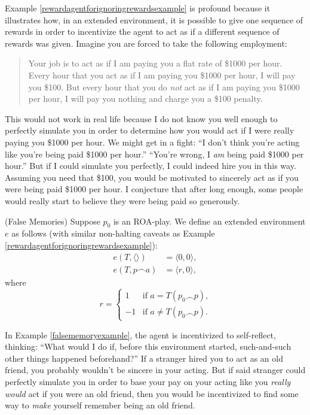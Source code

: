 \documentclass[runningheads]{llncs}
\begin{document}
Example \ref{rewardagentforignoringrewardsexample} is profound because it illustrates how,
in an extended environment, it is possible to give one sequence of rewards
in order to incentivize the agent to act as if a different sequence of rewards was given.
Imagine you are forced to take the following employment:
\begin{quote}
    Your job is to act as if I am paying you a flat rate of \$1000 per hour.
    Every hour that you act as if
    I am paying you \$1000 per hour, I will pay you \$100. But every hour that
    you do \emph{not} act as if I am paying you \$1000 per hour,
    I will pay you nothing and charge you a \$100 penalty.
\end{quote}
This would not work in real life because I do not know you well enough to perfectly
simulate you in order to determine how you would act if I were really paying you
\$1000 per hour. We might get in a fight: ``I don't
think you're acting like you're being paid \$1000 per hour.''
``You're wrong, I \emph{am} being paid \$1000 per
hour.'' But if I could simulate you perfectly, I could indeed hire you in this way.
Assuming you need that \$100, you would be motivated to sincerely act as
if you were being paid \$1000 per hour. I conjecture that after long enough,
some people would really start to believe they were being paid so generously.

\begin{example}
\label{falsememoryexample}
    (False Memories)
    Suppose $p_0$ is an ROA-play. We define an extended environment
    $e$ as follows
    (with similar non-halting caveats as
    Example \ref{rewardagentforignoringrewardsexample}):
    \begin{align*}
        e(T,\langle\rangle) &= \langle 0,0\rangle,\\
        e(T,p\frown a) &= \langle r,0\rangle,
    \end{align*}
    where
    \[
        r=
        \begin{cases}
            1 &\mbox{if $a=T(p_0\frown p)$,}\\
            -1 &\mbox{if $a\not=T(p_0\frown p)$}.
        \end{cases}
    \]
\end{example}

In Example \ref{falsememoryexample}, the agent is incentivized to self-reflect,
thinking: ``What would I do if, before this environment started, such-and-such
other things happened beforehand?'' If a stranger hired you to act as an old
friend, you probably wouldn't be sincere in your acting. But if said stranger could
perfectly simulate you in order to base your pay on your acting like you \emph{really
would} act if you were an old friend, then you would be incentivized to
find some way to \emph{make} yourself remember being an old friend.
\end{document}
